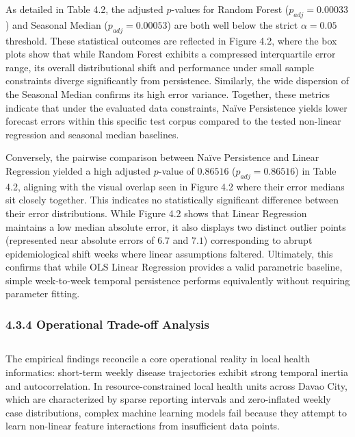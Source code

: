 \documentclass[
]{article}
\begin{document}
As detailed in Table 4.2, the adjusted \(p\)-values for Random Forest
(\(p_{adj} = 0.00033\)) and Seasonal Median (\(p_{adj} = 0.00053\)) are
both well below the strict \(\alpha = 0.05\) threshold. These
statistical outcomes are reflected in Figure 4.2, where the box plots
show that while Random Forest exhibits a compressed interquartile error
range, its overall distributional shift and performance under small
sample constraints diverge significantly from persistence. Similarly,
the wide dispersion of the Seasonal Median confirms its high error
variance. Together, these metrics indicate that under the evaluated data
constraints, Naïve Persistence yields lower forecast errors within this
specific test corpus compared to the tested non-linear regression and
seasonal median baselines.

Conversely, the pairwise comparison between Naïve Persistence and Linear
Regression yielded a high adjusted \(p\)-value of \(0.86516\)
(\(p_{adj} = 0.86516\)) in Table 4.2, aligning with the visual overlap
seen in Figure 4.2 where their error medians sit closely together. This
indicates no statistically significant difference between their error
distributions. While Figure 4.2 shows that Linear Regression maintains a
low median absolute error, it also displays two distinct outlier points
(represented near absolute errors of \(6.7\) and \(7.1\)) corresponding
to abrupt epidemiological shift weeks where linear assumptions faltered.
Ultimately, this confirms that while OLS Linear Regression provides a
valid parametric baseline, simple week-to-week temporal persistence
performs equivalently without requiring parameter fitting.

\subsubsection{\texorpdfstring{\textbf{4.3.4 Operational Trade-off
Analysis}}{4.3.4 Operational Trade-off Analysis}}\label{operational-trade-off-analysis}

\subsection{}\label{section-11}

The empirical findings reconcile a core operational reality in local
health informatics: short-term weekly disease trajectories exhibit
strong temporal inertia and autocorrelation. In resource-constrained
local health units across Davao City, which are characterized by sparse
reporting intervals and zero-inflated weekly case distributions, complex
machine learning models fail because they attempt to learn non-linear
feature interactions from insufficient data points.
\end{document}
